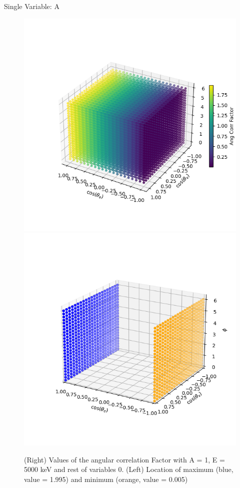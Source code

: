 \documentclass{beamer}
\begin{document}
\begin{frame}{Single Variable: A}
\begin{figure}
	\centering
	\includegraphics[width=0.4\paperwidth]{plots/A_3D_image.png}
	\includegraphics[width=0.4\paperwidth]{plots/A_max_min.png}
	\caption{(Right) Values of the angular correlation Factor with A = 1, E = 5000 keV and rest of variables 0. (Left) Location of maximum (blue, value = 1.995) and minimum (orange, value = 0.005)}
\end{figure}
\end{frame}
\end{document}
